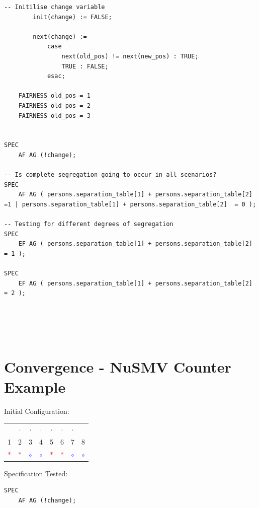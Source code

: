 \documentclass[twoside,openright]{article}
\let\oldsection\section%
\renewcommand{\section}{\cleardoublepage\oldsection}%
\newcommand{\x}{\textbf{\textcolor{red}{$\ast$}}} %
\newcommand{\z}{\textbf{\textcolor{blue}{$\circ$}}} %
\begin{document}
\begin{appendices}
\begin{lstlisting}
-- Initilise change variable 
		init(change) := FALSE;

		next(change) := 
			case
				next(old_pos) != next(new_pos) : TRUE;
				TRUE : FALSE;
			esac; 

	FAIRNESS old_pos = 1
	FAIRNESS old_pos = 2
	FAIRNESS old_pos = 3


SPEC
	AF AG (!change);

-- Is complete segregation going to occur in all scenarios?
SPEC
	AF AG ( persons.separation_table[1] + persons.separation_table[2] =1 | persons.separation_table[1] + persons.separation_table[2]  = 0 );

-- Testing for different degrees of segregation
SPEC
	EF AG ( persons.separation_table[1] + persons.separation_table[2] = 1 ); 

SPEC
	EF AG ( persons.separation_table[1] + persons.separation_table[2] = 2 ); 





\end{lstlisting}


\section{Convergence - NuSMV Counter Example}
\label{appendix:counter example convergence 3}
Initial Configuration:

\begin{table}[H]
\begin{center}
{\begin{tabular}{| c |c| c| c| c |c| c |c| }
\hline
 &  $\cdot$&  $\cdot$ &  $\cdot$ & $\cdot$ & $\cdot$ &  $\cdot$ &  \\
1 & 2 &3 &4 &5 &6  &7 &8\\
\x & \x &\z &\z &\x &\x  &\z &\z  \\
 \hline
\end{tabular}}
\end{center}
\end{table}

Specification Tested:
\begin{lstlisting}
SPEC
    AF AG (!change);
 \end{lstlisting}



\end{appendices}
\end{document}
